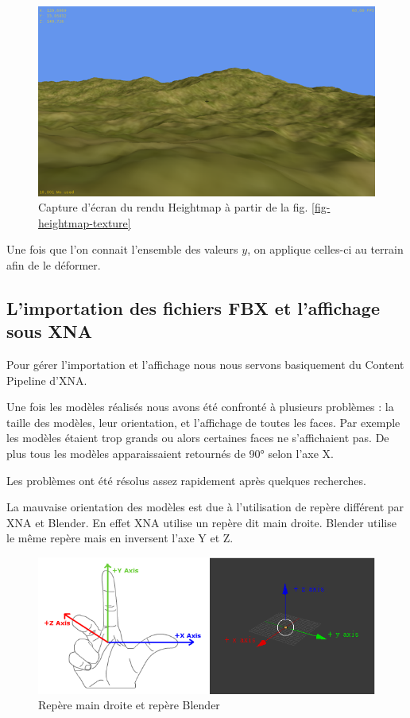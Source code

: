 \documentclass[11pt]{report}
\begin{document}
\begin{figure}[htbp]
\centering
\includegraphics[scale=1]{heightmap-rendu.png}
\caption{Capture d'écran du rendu Heightmap à partir de la fig. \ref{fig-heightmap-texture}}
\end{figure}

Une fois que l'on connait l'ensemble des valeurs \( y \), on applique celles-ci au terrain afin de le déformer.

\subsection{L’importation des fichiers FBX et l’affichage sous XNA}

Pour gérer l'importation et l’affichage nous nous servons basiquement du Content Pipeline d’XNA.

Une fois les modèles réalisés nous avons été confronté à plusieurs problèmes : la taille des modèles, leur orientation, et l’affichage de toutes les faces. Par exemple les modèles étaient trop grands ou alors certaines faces ne s’affichaient pas. De plus tous les modèles apparaissaient retournés de \ang{90} selon l'axe X.

Les problèmes ont été résolus assez rapidement après quelques recherches.

La mauvaise orientation des modèles est due à l'utilisation de repère différent par XNA et Blender. En effet XNA utilise un repère dit main droite. Blender utilise le même repère mais en inversent l'axe Y et Z.

\begin{figure}[htbp]
\centering
\includegraphics[scale=0.6]{repere.png}
\caption{Repère main droite et repère Blender}
\end{figure}
\end{document}
